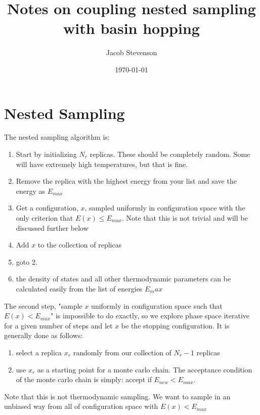 \documentclass[a4paper]{article}
\title{Notes on coupling nested sampling with basin hopping}
\author{Jacob Stevenson}
\date{\today}
\begin{document}
\maketitle


\section{Nested Sampling}

The nested sampling algorithm is:
\begin{enumerate}
  \item Start by initializing $N_r$ replicas.  These should be completely random.  Some will have extremely high 
    temperatures, but that is fine.

  \item Remove the replica with the highest energy from your list and save the energy as $E_{max}$

  \item Get a configuration, $x$, sampled uniformly in configuration space
    with the only criterion that $E(x) \le E_{max}$.  Note that this is not trivial and will
    be discussed further below
  
  \item Add $x$ to the collection of replicas

  \item goto 2.

  \item the density of states and all other thermodynamic parameters can be calculated easily from the list of energies $E_max$

\end{enumerate}


The second step, "sample $x$ uniformly in configuration space such that $E(x) < E_{max}$" is
impossible to do exactly, so we explore phase space iterative for a given
number of steps and let $x$ be the stopping configuration.
It is generally done as follows:

\begin{enumerate}
  \item select a replica $x_r$ randomly from our collection of $N_r - 1$ replicas
  
  \item use $x_r$ as a starting point for a monte carlo chain.  The acceptance condition 
    of the monte carlo chain is simply: accept if $E_{new} < E_{max}$.  
\end{enumerate}

Note that this is not thermodynamic sampling.  We want to sample in an unbiased
way from all of configuration space with $E(x) < E_{max}$
\end{document}
